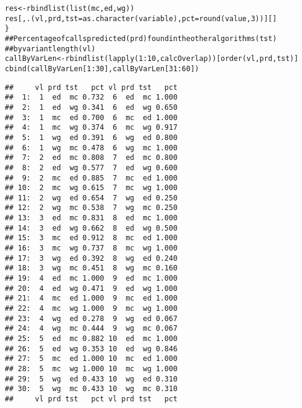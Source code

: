 \documentclass{article}\usepackage[]{graphicx}\usepackage[]{color}
\makeatletter
\newcommand{\hlnum}[1]{\textcolor[rgb]{0.063,0.58,0.627}{#1}}%
\newcommand{\hlcom}[1]{\textcolor[rgb]{0.588,0.588,0.588}{#1}}%
\newcommand{\hlopt}[1]{\textcolor[rgb]{0.196,0.196,0.196}{#1}}%
\newcommand{\hlstd}[1]{\textcolor[rgb]{0.196,0.196,0.196}{#1}}%
\newcommand{\hlkwb}[1]{\textcolor[rgb]{0.627,0,0.314}{#1}}%
\newcommand{\hlkwc}[1]{\textcolor[rgb]{0,0.631,0.314}{#1}}%
\newcommand{\hlkwd}[1]{\textcolor[rgb]{0.78,0.227,0.412}{#1}}%
\newenvironment{kframe}{%
 \def\at@end@of@kframe{}%
 \ifinner\ifhmode%
  \def\at@end@of@kframe{\end{minipage}}%
  \begin{minipage}{\columnwidth}%
 \fi\fi%
 \def\FrameCommand##1{\hskip\@totalleftmargin \hskip-\fboxsep
 \colorbox{shadecolor}{##1}\hskip-\fboxsep
     \hskip-\linewidth \hskip-\@totalleftmargin \hskip\columnwidth}%
 \MakeFramed {\advance\hsize-\width
   \@totalleftmargin\z@ \linewidth\hsize
   \@setminipage}}%
 {\par\unskip\endMakeFramed%
 \at@end@of@kframe}
\newenvironment{knitrout}{}{} %
\makeatother
\begin{document}
\begin{knitrout}
\begin{kframe}
\begin{alltt}
  \hlstd{res} \hlkwb{<-} \hlkwd{rbindlist}\hlstd{(}\hlkwd{list}\hlstd{(mc, ed, wg))}
  \hlstd{res[ ,} \hlkwd{.}\hlstd{(vl, prd,} \hlkwc{tst} \hlstd{=} \hlkwd{as.character}\hlstd{(variable),} \hlkwc{pct} \hlstd{=} \hlkwd{round}\hlstd{(value,} \hlnum{3}\hlstd{))][]}
\hlstd{\}}
\hlcom{## Percentage of calls predicted (prd) found in the other algorithms (tst)}
\hlcom{## by variant length (vl)}
\hlstd{callByVarLen} \hlkwb{<-} \hlkwd{rbindlist}\hlstd{(}\hlkwd{lapply}\hlstd{(}\hlnum{1}\hlopt{:}\hlnum{10}\hlstd{, calcOverlap))[}\hlkwd{order}\hlstd{(vl, prd, tst)]}
\hlkwd{cbind}\hlstd{(callByVarLen[}\hlnum{1}\hlopt{:}\hlnum{30}\hlstd{], callByVarLen[}\hlnum{31}\hlopt{:}\hlnum{60}\hlstd{])}
\end{alltt}
\begin{verbatim}
##     vl prd tst   pct vl prd tst   pct
##  1:  1  ed  mc 0.732  6  ed  mc 1.000
##  2:  1  ed  wg 0.341  6  ed  wg 0.650
##  3:  1  mc  ed 0.700  6  mc  ed 1.000
##  4:  1  mc  wg 0.374  6  mc  wg 0.917
##  5:  1  wg  ed 0.391  6  wg  ed 0.800
##  6:  1  wg  mc 0.478  6  wg  mc 1.000
##  7:  2  ed  mc 0.808  7  ed  mc 0.800
##  8:  2  ed  wg 0.577  7  ed  wg 0.600
##  9:  2  mc  ed 0.885  7  mc  ed 1.000
## 10:  2  mc  wg 0.615  7  mc  wg 1.000
## 11:  2  wg  ed 0.654  7  wg  ed 0.250
## 12:  2  wg  mc 0.538  7  wg  mc 0.250
## 13:  3  ed  mc 0.831  8  ed  mc 1.000
## 14:  3  ed  wg 0.662  8  ed  wg 0.500
## 15:  3  mc  ed 0.912  8  mc  ed 1.000
## 16:  3  mc  wg 0.737  8  mc  wg 1.000
## 17:  3  wg  ed 0.392  8  wg  ed 0.240
## 18:  3  wg  mc 0.451  8  wg  mc 0.160
## 19:  4  ed  mc 1.000  9  ed  mc 1.000
## 20:  4  ed  wg 0.471  9  ed  wg 1.000
## 21:  4  mc  ed 1.000  9  mc  ed 1.000
## 22:  4  mc  wg 1.000  9  mc  wg 1.000
## 23:  4  wg  ed 0.278  9  wg  ed 0.067
## 24:  4  wg  mc 0.444  9  wg  mc 0.067
## 25:  5  ed  mc 0.882 10  ed  mc 1.000
## 26:  5  ed  wg 0.353 10  ed  wg 0.846
## 27:  5  mc  ed 1.000 10  mc  ed 1.000
## 28:  5  mc  wg 1.000 10  mc  wg 1.000
## 29:  5  wg  ed 0.433 10  wg  ed 0.310
## 30:  5  wg  mc 0.433 10  wg  mc 0.310
##     vl prd tst   pct vl prd tst   pct
\end{verbatim}
\end{kframe}
\end{knitrout}
\end{document}
